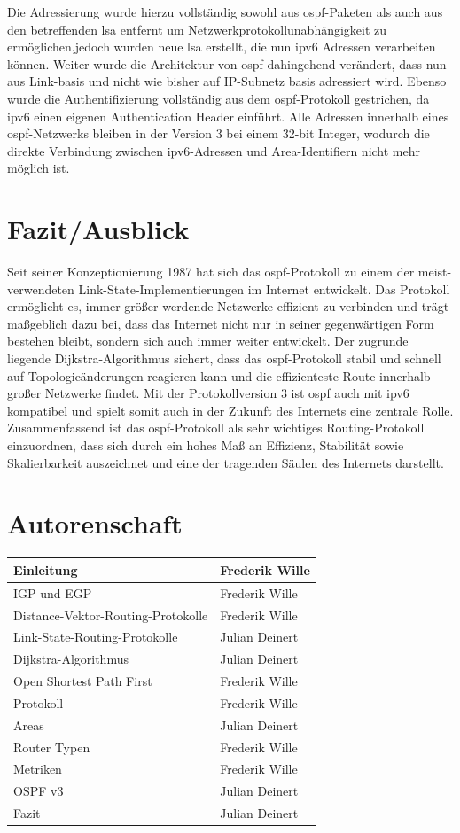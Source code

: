 \documentclass[11pt,a4paper,final]{article}
\begin{document}
Die Adressierung wurde hierzu vollständig sowohl aus \ac{ospf}-Paketen als auch aus den betreffenden \ac{lsa} entfernt um Netzwerkprotokollunabhängigkeit  zu ermöglichen,jedoch wurden neue \ac{lsa} erstellt, die nun \ac{ipv6} Adressen verarbeiten können. Weiter wurde die Architektur von \ac{ospf} dahingehend verändert, dass nun aus Link-basis und nicht wie bisher auf IP-Subnetz basis adressiert wird. Ebenso wurde die Authentifizierung vollständig aus dem \ac{ospf}-Protokoll gestrichen, da \ac{ipv6} einen eigenen Authentication Header einführt. Alle Adressen innerhalb eines \ac{ospf}-Netzwerks bleiben in der Version 3 bei einem 32-bit Integer, wodurch die direkte Verbindung zwischen \ac{ipv6}-Adressen und Area-Identifiern nicht mehr möglich ist. \citep{ospfv3}
\newpage
\section{Fazit/Ausblick}
Seit seiner Konzeptionierung 1987 hat sich das \ac{ospf}-Protokoll zu einem der meist-verwendeten Link-State-Implementierungen im Internet entwickelt. Das Protokoll ermöglicht es, immer größer-werdende Netzwerke effizient zu verbinden und trägt maßgeblich dazu bei, dass das Internet nicht nur in seiner gegenwärtigen Form bestehen bleibt, sondern sich auch immer weiter entwickelt. Der zugrunde liegende Dijkstra-Algorithmus sichert, dass das \ac{ospf}-Protokoll stabil und schnell auf Topologieänderungen reagieren kann und die effizienteste Route innerhalb großer Netzwerke findet. Mit der Protokollversion 3 ist \ac{ospf} auch mit \ac{ipv6} kompatibel und spielt somit auch in der Zukunft des Internets eine zentrale Rolle. \\
Zusammenfassend ist das \ac{ospf}-Protokoll als sehr wichtiges Routing-Protokoll einzuordnen, dass sich durch ein hohes Maß an Effizienz, Stabilität sowie Skalierbarkeit auszeichnet und eine der tragenden Säulen des Internets darstellt.

\clearpage


\section*{Autorenschaft}
\begin{tabular}{l l}
	Einleitung & Frederik Wille \\
\hline
	IGP und EGP & Frederik Wille \\
	Distance-Vektor-Routing-Protokolle & Frederik Wille \\
	Link-State-Routing-Protokolle & Julian Deinert \\
	Dijkstra-Algorithmus & Julian Deinert \\
\hline
	Open Shortest Path First & Frederik Wille \\
	Protokoll & Frederik Wille \\
	Areas & Julian Deinert \\
	Router Typen & Frederik Wille \\
	Metriken & Frederik Wille \\
	OSPF v3 & Julian Deinert \\
\hline
	Fazit & Julian Deinert \\
\end{tabular}
\end{document}
